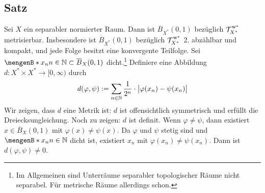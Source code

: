 \subsection[Satz: Metrisierbarkeit von $\overline{B_{X^*}(0,1)}$ bezüglich der $\w^*$-Topologie]{Satz} %
\label{sub:512}
Sei $X$ ein separabler normierter Raum. Dann ist $\overline{B}_{X^*}(0,1)$ bezüglich $\weakTstar{X^*}$ metrisierbar. Insbesondere ist $\overline{B}_{X^*}(0,1)$ bezüglich
$\weakTstar{X^*}$ 2. abzählbar und kompakt, und jede Folge besitzt eine konvergente Teilfolge.
Sei $\set[x_n]{n \in \mathds{N}} \subset \overline{B}_X(0,1)$ dicht.\footnote{Im Allgemeinen sind Unterräume separabler topologischer Räume nicht separabel. Für metrische 
Räume allerdings schon.} Definiere eine Abbildung $d \colon X^* \times X^* \to [0,\infty)$ durch 
\[
	d(\varphi, \psi) := \sum_{n \in \mathds{N}} \frac{1}{2^n} \cdot \abs[\big]{\varphi(x_n) - \psi(x_n)}
\]
Wir zeigen, dass $d$ eine Metrik ist: $d$ ist offensichtlich symmetrisch und erfüllt die Dreiecksungleichung. Noch zu zeigen: $d$ ist definit. Wenn $\varphi \not= \psi$, dann
existiert $x \in \overline{B}_X(0,1)$ mit $\varphi(x) \not= \psi(x)$. Da $\varphi$ und $\psi$ stetig sind und $\set[x_n]{n \in \mathds{N}}$ dicht ist,
existiert $x_n$ mit $\varphi(x_n) \not= \psi(x_n)$. Dann ist $d(\varphi,\psi) \not= 0$.

